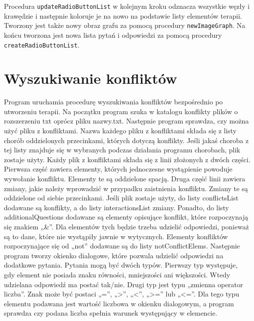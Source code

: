 Procedura \texttt{updateRadioButtonList} w kolejnym kroku odznacza wszystkie węzły i krawędzie i następnie koloruje je na nowo na podstawie listy elementów terapii. Tworzony jest także nowy obraz grafu za pomocą procedury \texttt{newImageGraph}. Na końcu tworzona jest nowa lista pytań i odpowiedzi za pomocą procedury \texttt{createRadioButtonList}. 

\section{Wyszukiwanie konfliktów}

Program uruchamia procedurę wyszukiwania konfliktów bezpośrednio po utworzeniu terapii. 
Na początku program szuka w katalogu konflikty plików o rozszerzeniu txt oprócz pliku nazwy.txt. Następnie program sprawdza, czy można użyć pliku z konfliktami. Nazwa każdego pliku z konfliktami składa się z listy chorób oddzielonych przecinkami, których dotyczą konflikty. Jeśli jakaś choroba z tej listy znajduje się w wybranych podczas działania programu chorobach, plik zostaje użyty. Każdy plik z konfliktami składa się z linii złożonych z dwóch części. Pierwsza część zawiera elementy, których jednoczesne wystąpienie powoduje wywołanie konfliktu. Elementy te są oddzielone spacją. Druga część linii zawiera zmiany, jakie należy wprowadzić w przypadku zaistnienia konfliktu. Zmiany te są oddzielone od siebie przecinkami. Jeśli plik zostaje użyty, do listy conflictsList dodawane są konflikty, a do listy interactionsList zmiany. 
Ponadto, do listy additionalQuestions dodawane są elementy opisujące konflikt, które rozpoczynają się znakiem „\&”. Dla elementów tych będzie trzeba udzielić odpowiedzi, ponieważ są to dane, które nie wystąpiły jawnie w wytycznych. Elementy konfliktów rozpoczynające się od „not” dodawane są do listy notConflictElems. Następnie program tworzy okienko dialogowe, które pozwala udzielić odpowiedzi na dodatkowe pytania. Pytania mogą być dwóch typów. Pierwszy typ występuje, gdy element nie posiada znaku równości, mniejszości ani większości. Wtedy udzielana odpowiedź ma postać tak/nie. 
Drugi typ jest typu „zmienna operator liczba”. Znak może być postaci „=”, „>”, „<”, „>=” lub „<=”. Dla tego typu elementu podawana jest wartość liczbowa w okienku dialogowym, a program sprawdza czy podana liczba spełnia warunek występujący w elemencie. 

